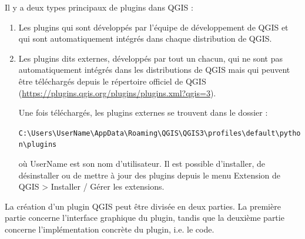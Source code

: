 \documentclass[11pt]{article}
\begin{document}
Il y a deux types principaux de plugins dans QGIS :
\begin{enumerate}\itemsep0.4em
\item Les plugins qui sont développés par l'équipe de développement de QGIS et qui sont automatiquement intégrés dans chaque distribution de QGIS. 
\item Les plugins dits \og{}externes\fg{}, développés par tout un chacun, qui ne sont pas automatiquement intégrés dans les distributions de QGIS mais qui peuvent être téléchargés depuis le répertoire officiel de QGIS (\url{https://plugins.qgis.org/plugins/plugins.xml?qgis=3}).

Une fois téléchargés, les plugins externes se trouvent dans le dossier : 

\begin{center}
\texttt{C:\textbackslash{}Users\textbackslash{}\textcolor{mygreen}{UserName}\textbackslash{}AppData\textbackslash{}Roaming\textbackslash{}QGIS\textbackslash{}QGIS3\textbackslash{}profiles\textbackslash{}default\textbackslash{}python\textbackslash{}plugins} 
\end{center}

où \textcolor{mygreen}{UserName} est son nom d'utilisateur. Il est possible d'installer, de désinstaller ou de mettre à jour des plugins depuis le menu \og{}Extension\fg{} de QGIS >{} \og{}Installer / Gérer les extensions\fg{}. 
\end{enumerate} 



La création d'un plugin QGIS peut être divisée en deux parties. La première partie concerne l'interface graphique du plugin, tandis que la deuxième partie concerne l'implémentation concrète du plugin, i.e. le code. 
\end{document}
